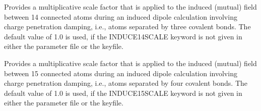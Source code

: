 \documentclass[letterpaper,11pt,english]{sphinxmanual}
\begin{document}
\ignorespaces {}\label{\detokenize{text/keywords:key-induce-14-scale}}\begin{description}
\sphinxAtStartPar
Provides a multiplicative scale factor that is applied to the induced (mutual) field between 1\sphinxhyphen{}4 connected atoms during an induced dipole calculation involving charge penetration damping, i.e., atoms separated by three covalent bonds. The default value of 1.0 is used, if the INDUCE\sphinxhyphen{}14\sphinxhyphen{}SCALE keyword is not given in either the parameter file or the keyfile.

\end{description}

\ignorespaces {}\label{\detokenize{text/keywords:key-induce-15-scale}}\begin{description}
\sphinxAtStartPar
Provides a multiplicative scale factor that is applied to the induced (mutual) field between 1\sphinxhyphen{}5 connected atoms during an induced dipole calculation involving charge penetration damping, i.e., atoms separated by four covalent bonds. The default value of 1.0 is used, if the INDUCE\sphinxhyphen{}15\sphinxhyphen{}SCALE keyword is not given in either the parameter file or the keyfile.

\end{description}
\end{document}
